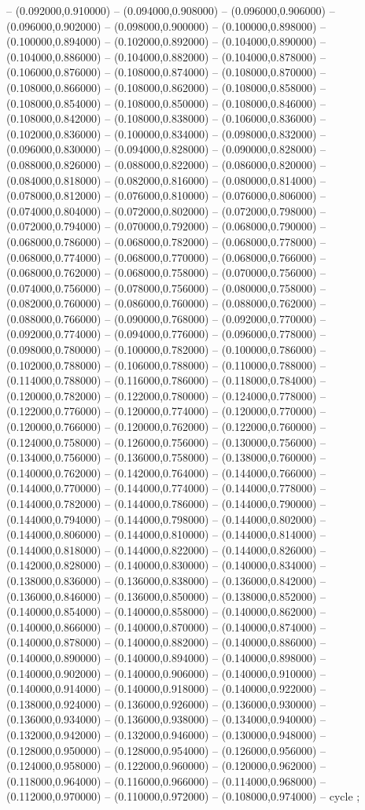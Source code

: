 -- (0.092000,0.910000) -- (0.094000,0.908000) -- (0.096000,0.906000) -- (0.096000,0.902000) -- (0.098000,0.900000) -- (0.100000,0.898000) -- (0.100000,0.894000) -- (0.102000,0.892000) -- (0.104000,0.890000) -- (0.104000,0.886000) -- (0.104000,0.882000) -- (0.104000,0.878000) -- (0.106000,0.876000) -- (0.108000,0.874000) -- (0.108000,0.870000) -- (0.108000,0.866000) -- (0.108000,0.862000) -- (0.108000,0.858000) -- (0.108000,0.854000) -- (0.108000,0.850000) -- (0.108000,0.846000) -- (0.108000,0.842000) -- (0.108000,0.838000) -- (0.106000,0.836000) -- (0.102000,0.836000) -- (0.100000,0.834000) -- (0.098000,0.832000) -- (0.096000,0.830000) -- (0.094000,0.828000) -- (0.090000,0.828000) -- (0.088000,0.826000) -- (0.088000,0.822000) -- (0.086000,0.820000) -- (0.084000,0.818000) -- (0.082000,0.816000) -- (0.080000,0.814000) -- (0.078000,0.812000) -- (0.076000,0.810000) -- (0.076000,0.806000) -- (0.074000,0.804000) -- (0.072000,0.802000) -- (0.072000,0.798000) -- (0.072000,0.794000) -- (0.070000,0.792000) -- (0.068000,0.790000) -- (0.068000,0.786000) -- (0.068000,0.782000) -- (0.068000,0.778000) -- (0.068000,0.774000) -- (0.068000,0.770000) -- (0.068000,0.766000) -- (0.068000,0.762000) -- (0.068000,0.758000) -- (0.070000,0.756000) -- (0.074000,0.756000) -- (0.078000,0.756000) -- (0.080000,0.758000) -- (0.082000,0.760000) -- (0.086000,0.760000) -- (0.088000,0.762000) -- (0.088000,0.766000) -- (0.090000,0.768000) -- (0.092000,0.770000) -- (0.092000,0.774000) -- (0.094000,0.776000) -- (0.096000,0.778000) -- (0.098000,0.780000) -- (0.100000,0.782000) -- (0.100000,0.786000) -- (0.102000,0.788000) -- (0.106000,0.788000) -- (0.110000,0.788000) -- (0.114000,0.788000) -- (0.116000,0.786000) -- (0.118000,0.784000) -- (0.120000,0.782000) -- (0.122000,0.780000) -- (0.124000,0.778000) -- (0.122000,0.776000) -- (0.120000,0.774000) -- (0.120000,0.770000) -- (0.120000,0.766000) -- (0.120000,0.762000) -- (0.122000,0.760000) -- (0.124000,0.758000) -- (0.126000,0.756000) -- (0.130000,0.756000) -- (0.134000,0.756000) -- (0.136000,0.758000) -- (0.138000,0.760000) -- (0.140000,0.762000) -- (0.142000,0.764000) -- (0.144000,0.766000) -- (0.144000,0.770000) -- (0.144000,0.774000) -- (0.144000,0.778000) -- (0.144000,0.782000) -- (0.144000,0.786000) -- (0.144000,0.790000) -- (0.144000,0.794000) -- (0.144000,0.798000) -- (0.144000,0.802000) -- (0.144000,0.806000) -- (0.144000,0.810000) -- (0.144000,0.814000) -- (0.144000,0.818000) -- (0.144000,0.822000) -- (0.144000,0.826000) -- (0.142000,0.828000) -- (0.140000,0.830000) -- (0.140000,0.834000) -- (0.138000,0.836000) -- (0.136000,0.838000) -- (0.136000,0.842000) -- (0.136000,0.846000) -- (0.136000,0.850000) -- (0.138000,0.852000) -- (0.140000,0.854000) -- (0.140000,0.858000) -- (0.140000,0.862000) -- (0.140000,0.866000) -- (0.140000,0.870000) -- (0.140000,0.874000) -- (0.140000,0.878000) -- (0.140000,0.882000) -- (0.140000,0.886000) -- (0.140000,0.890000) -- (0.140000,0.894000) -- (0.140000,0.898000) -- (0.140000,0.902000) -- (0.140000,0.906000) -- (0.140000,0.910000) -- (0.140000,0.914000) -- (0.140000,0.918000) -- (0.140000,0.922000) -- (0.138000,0.924000) -- (0.136000,0.926000) -- (0.136000,0.930000) -- (0.136000,0.934000) -- (0.136000,0.938000) -- (0.134000,0.940000) -- (0.132000,0.942000) -- (0.132000,0.946000) -- (0.130000,0.948000) -- (0.128000,0.950000) -- (0.128000,0.954000) -- (0.126000,0.956000) -- (0.124000,0.958000) -- (0.122000,0.960000) -- (0.120000,0.962000) -- (0.118000,0.964000) -- (0.116000,0.966000) -- (0.114000,0.968000) -- (0.112000,0.970000) -- (0.110000,0.972000) -- (0.108000,0.974000) -- cycle
   ;
